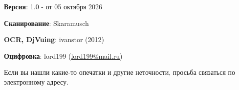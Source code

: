 \documentclass[12pt, a4paper, openany]{book}
\begin{document}
\hangindent=2cm   	\textbf{Версия}: 1.0 - от 05 октября 2026

\hangindent=2cm   	\textbf{Сканирование}: Skaramusch

\hangindent=2cm   	\textbf{OCR, DjVuing}: ivanstor (2012)

\hangindent=2cm   	\textbf{Оцифровка}: lord199 (\href{mailto:lord199@mail.ru}{lord199@mail.ru})



\hangindent=2cm   Если вы нашли какие-то опечатки и другие неточности, просьба связаться по электронному адресу.




\thispagestyle{empty} %

	
\end{document}
